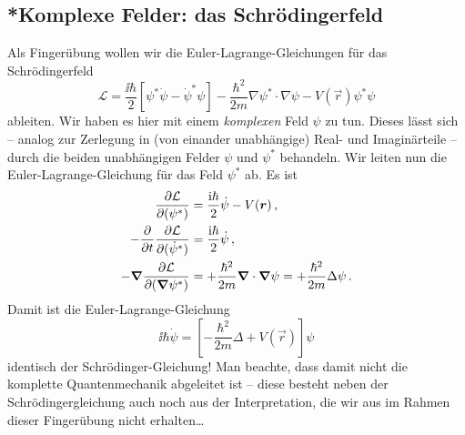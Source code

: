 \documentclass[paper=a4, fontsize=11.0pt, abstractoff, DIV12]{scrartcl}
\newcommand{\LD}{\ensuremath{\mathcal{L}}}
\begin{document}
\subsection{*Komplexe Felder: das Schrödingerfeld}

Als Fingerübung wollen wir die Euler-Lagrange-Gleichungen für das
Schrödingerfeld
\begin{equation}
\LD =\frac{\ii\hbar}{2}\left[\psi^*\dot\psi - \dot{\psi}^*\psi \right] - \frac{\hbar^2}{2m}\nabla\psi^*\cdot\nabla\psi - V(\vec r)\psi^*\psi
\end{equation}
ableiten. Wir haben es hier mit einem \emph{komplexen} Feld $\psi$ zu tun.
Dieses lässt sich -- analog zur Zerlegung in (von einander unabhängige)
Real- und Imaginärteile -- durch die beiden unabhängigen Felder $\psi$ und
$\psi^*$ behandeln. Wir leiten nun die Euler-Lagrange-Gleichung für das Feld
$\psi^*$ ab. Es ist
\begin{align*}
\firstpderiv{\LD}{(\psi^*)} &= \frac{\ii\hbar}{2}\dot\psi-V(\vec r)\,,\\
-\firstpderiv{}{t}\firstpderiv{\LD}{(\dot\psi^*)} &= \frac{\ii\hbar}{2}\dot\psi\,,\\
-\nabla\firstpderiv{\LD}{(\nabla\psi^*)} &= +\frac{\hbar^2}{2m}\nabla\cdot\nabla\psi = +\frac{\hbar^2}{2m}\Delta\psi\,.
\end{align*}
Damit ist die Euler-Lagrange-Gleichung
\begin{equation}
\ii\hbar \dot\psi =\left[ -\frac{\hbar^2}{2m}\Delta + V(\vec r)\right]\psi
\end{equation}
identisch der Schrödinger-Gleichung! Man beachte, dass damit nicht die
komplette Quantenmechanik abgeleitet ist -- diese besteht neben der
Schrödingergleichung auch noch aus der Interpretation, die wir aus im Rahmen
dieser Fingerübung nicht erhalten\dots




\end{document}
